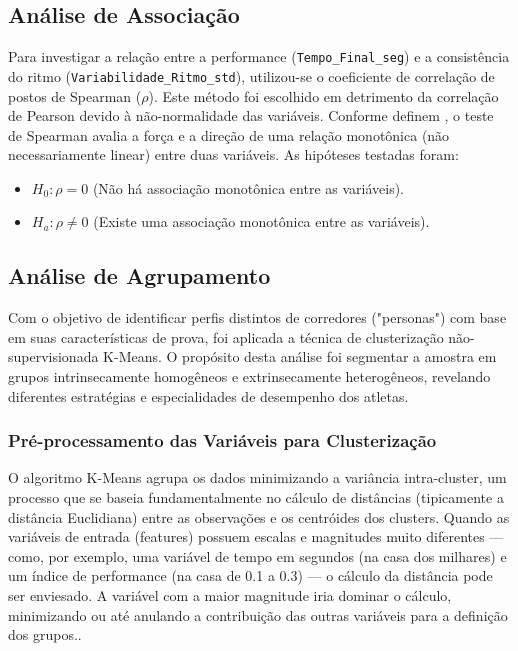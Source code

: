 \subsection{Análise de Associação}
Para investigar a relação entre a performance (\texttt{Tempo\_Final\_seg}) e a consistência do ritmo (\texttt{Variabilidade\_Ritmo\_std}), utilizou-se o coeficiente de correlação de postos de Spearman ($\rho$). Este método foi escolhido em detrimento da correlação de Pearson devido à não-normalidade das variáveis. Conforme definem \citet{siegel1988}, o teste de Spearman avalia a força e a direção de uma relação monotônica (não necessariamente linear) entre duas variáveis. As hipóteses testadas foram:
\begin{itemize}
    \item $H_0: \rho = 0$ (Não há associação monotônica entre as variáveis).
    \item $H_a: \rho \neq 0$ (Existe uma associação monotônica entre as variáveis).
\end{itemize}

\subsection{Análise de Agrupamento}

Com o objetivo de identificar perfis distintos de corredores ("personas") com base em suas características de prova, foi aplicada a técnica de clusterização não-supervisionada K-Means. O propósito desta análise foi segmentar a amostra em grupos intrinsecamente homogêneos e extrinsecamente heterogêneos, revelando diferentes estratégias e especialidades de desempenho dos atletas.

\subsubsection{Pré-processamento das Variáveis para Clusterização}

O algoritmo K-Means agrupa os dados minimizando a variância intra-cluster, um processo que se baseia fundamentalmente no cálculo de distâncias (tipicamente a distância Euclidiana) entre as observações e os centróides dos clusters. Quando as variáveis de entrada (features) possuem escalas e magnitudes muito diferentes — como, por exemplo, uma variável de tempo em segundos (na casa dos milhares) e um índice de performance (na casa de 0.1 a 0.3) — o cálculo da distância pode ser enviesado. A variável com a maior magnitude iria dominar o cálculo, minimizando ou até anulando a contribuição das outras variáveis para a definição dos grupos.\cite{muller2016}.

